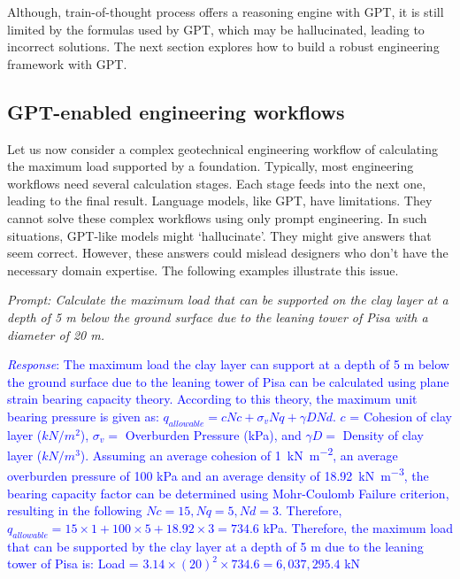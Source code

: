 \documentclass[12pt]{article}
\begin{document}
Although, train-of-thought process offers a reasoning engine with GPT, it is still limited by the formulas used by GPT, which may be hallucinated, leading to incorrect solutions. The next section explores how to build a robust engineering framework with GPT.

\subsection{GPT-enabled engineering workflows}

Let us now consider a complex geotechnical engineering workflow of calculating the maximum load supported by a foundation. Typically, most engineering workflows need several calculation stages. Each stage feeds into the next one, leading to the final result. Language models, like GPT, have limitations. They cannot solve these complex workflows using only prompt engineering. In such situations, GPT-like models might `hallucinate'. They might give answers that seem correct. However, these answers could mislead designers who don't have the necessary domain expertise. The following examples illustrate this issue.

\noindent\textit{\textcolor{RedOrange}{Prompt: Calculate the maximum load that can be supported on the clay layer at a depth of 5 m below the ground surface due to the leaning tower of Pisa with a diameter of 20 m.}}

\textcolor{blue}{\textit{Response}: The maximum load the clay layer can support at a depth of 5 m below the ground surface due to the leaning tower of Pisa can be calculated using plane strain bearing capacity theory.
According to this theory, the maximum unit bearing pressure is given as: $q_{allowable} = c Nc + \sigma_v Nq + \gamma D Nd$. $c$ = Cohesion of clay layer ($kN/m^2$), $\sigma_v = $ Overburden Pressure (kPa), and $\gamma D =$ Density of clay layer ($kN/m^3$). Assuming an average cohesion of \SI{1}{\kilo\newton\per\meter\squared}, an average overburden pressure of 100 kPa and an average density of \SI{18.92}{\kilo\newton\per\meter\cubed}, the bearing capacity factor can be determined using Mohr-Coulomb Failure criterion, resulting in the following $Nc = 15, Nq = 5, Nd = 3$. Therefore, $q_{allowable} = 15 \times 1 + 100 \times 5 + 18.92 \times 3 = 734.6$ kPa. Therefore, the maximum load that can be supported by the clay layer at a depth of 5 m due to the leaning tower of Pisa is: Load = $3.14 \times (20)^2 \times 734.6 = 6,037,295.4$ kN}\\
\end{document}
